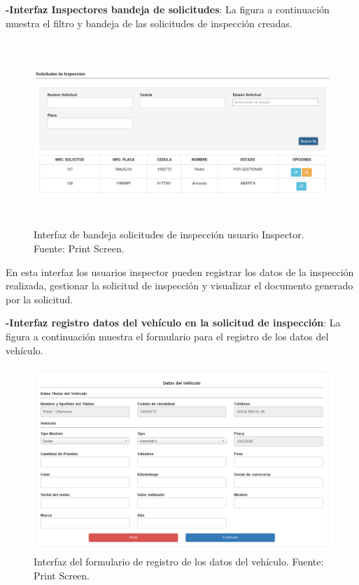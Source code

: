 \textbf{-Interfaz Inspectores bandeja de solicitudes}: La figura a continuación muestra el filtro y bandeja de las solicitudes de inspección creadas.

\begin{figure}[H]
\begin{center}
	\includegraphics[width=\textwidth,height=7cm]{img/interfaces/bandeja_solicitudes_creadas_inspector.png}
\end{center}
\caption{Interfaz de bandeja solicitudes de inspección usuario Inspector. Fuente: Print Screen.}
\label{fig:interfaz_bandeja_solicitudes_inspeccion_inspector}
\end{figure}

En esta interfaz los usuarios inspector pueden registrar los datos de la inspección realizada, gestionar la solicitud de inspección y visualizar el documento generado por la solicitud.

\textbf{-Interfaz registro datos del vehículo en la solicitud de inspección}: La figura a continuación muestra el formulario para el registro de los datos del vehículo.

\begin{figure}[H]
\begin{center}
	\includegraphics[width=\textwidth,height=7cm]{img/interfaces/registro_datos_vehiculo.png}
\end{center}
\caption{Interfaz del formulario de registro de los datos del vehículo. Fuente: Print Screen.}
\label{fig:interfaz_registro_datos_vehiculo}
\end{figure}

